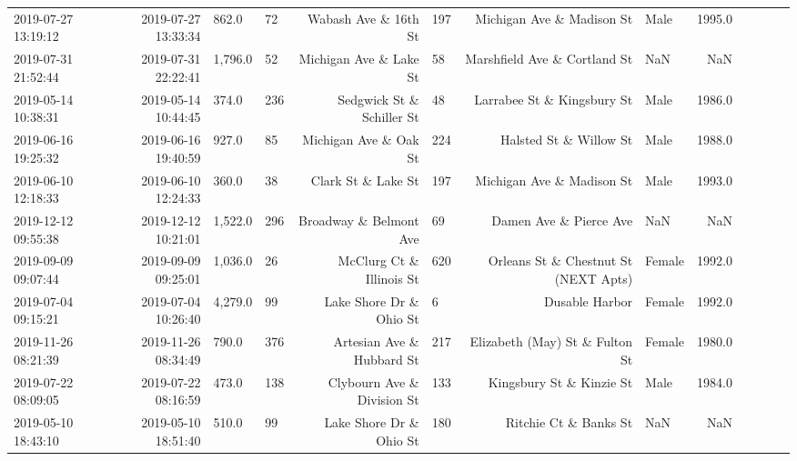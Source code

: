 \begin{table}[H]
{\begin{tabular}{lrllrlrlrlllr}
 2019-07-27 13:19:12 &  2019-07-27 13:33:34 &        862.0 &               72 &                  Wabash Ave \& 16th St &            197 &             Michigan Ave \& Madison St &    Male &     1995.0 \\
 2019-07-31 21:52:44 &  2019-07-31 22:22:41 &      1,796.0 &               52 &                Michigan Ave \& Lake St &             58 &          Marshfield Ave \& Cortland St &     NaN &        NaN \\
 2019-05-14 10:38:31 &  2019-05-14 10:44:45 &        374.0 &              236 &             Sedgwick St \& Schiller St &             48 &            Larrabee St \& Kingsbury St &    Male &     1986.0 \\
 2019-06-16 19:25:32 &  2019-06-16 19:40:59 &        927.0 &               85 &                 Michigan Ave \& Oak St &            224 &                Halsted St \& Willow St &    Male &     1988.0 \\
 2019-06-10 12:18:33 &  2019-06-10 12:24:33 &        360.0 &               38 &                    Clark St \& Lake St &            197 &             Michigan Ave \& Madison St &    Male &     1993.0 \\
 2019-12-12 09:55:38 &  2019-12-12 10:21:01 &      1,522.0 &              296 &                Broadway \& Belmont Ave &             69 &                Damen Ave \& Pierce Ave &     NaN &        NaN \\
 2019-09-09 09:07:44 &  2019-09-09 09:25:01 &      1,036.0 &               26 &              McClurg Ct \& Illinois St &            620 &  Orleans St \& Chestnut St (NEXT Apts) &  Female &     1992.0 \\
 2019-07-04 09:15:21 &  2019-07-04 10:26:40 &      4,279.0 &               99 &               Lake Shore Dr \& Ohio St &              6 &                        Dusable Harbor &  Female &     1992.0 \\
 2019-11-26 08:21:39 &  2019-11-26 08:34:49 &        790.0 &              376 &             Artesian Ave \& Hubbard St &            217 &        Elizabeth (May) St \& Fulton St &  Female &     1980.0 \\
 2019-07-22 08:09:05 &  2019-07-22 08:16:59 &        473.0 &              138 &            Clybourn Ave \& Division St &            133 &              Kingsbury St \& Kinzie St &    Male &     1984.0 \\
 2019-05-10 18:43:10 &  2019-05-10 18:51:40 &        510.0 &               99 &               Lake Shore Dr \& Ohio St &            180 &                 Ritchie Ct \& Banks St &     NaN &        NaN \\

\end{tabular}}
\end{table}
